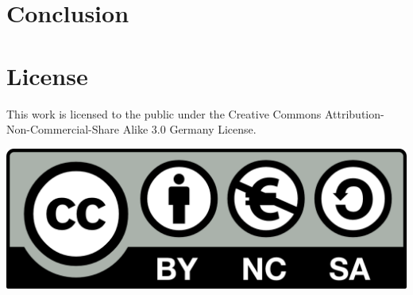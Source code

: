 \documentclass[a4paper,
    11pt,
    normalheadings,
    parindent,
    UKenglish,
    abstracton,
    ]{scrartcl}
\begin{document}
\section{Conclusion}

\section*{License}
This work is licensed to the public under the Creative Commons Attribution-Non-Commercial-Share Alike 3.0 Germany License.
\begin{center}\includegraphics{bin/by-nc-sa-eu.png}\end{center}
\end{document}
